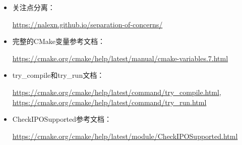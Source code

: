 
\begin{itemize}
\item
关注点分离：

\url{https://nalexn.github.io/separation-of-concerns/}

\item
完整的CMake变量参考文档：

\url{https://cmake.org/cmake/help/latest/manual/cmake-variables.7.html}

\item
try\_compile和try\_run文档：

\url{https://cmake.org/cmake/help/latest/command/try_compile.html}, \url{https://cmake.org/cmake/help/latest/command/try_run.html}

\item
CheckIPOSupported参考文档：

\url{https://cmake.org/cmake/help/latest/module/CheckIPOSupported.html}
\end{itemize}
